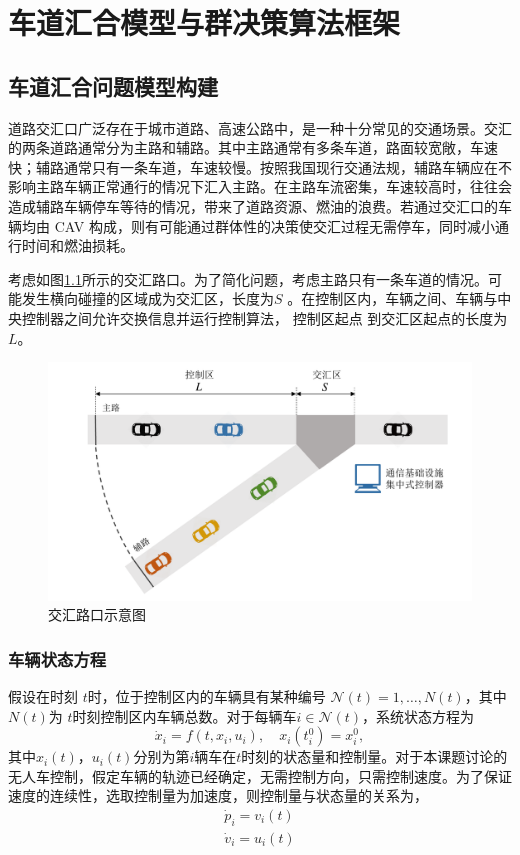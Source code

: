\chapter{车道汇合模型与群决策算法框架}
\section{车道汇合问题模型构建}
道路交汇口广泛存在于城市道路、高速公路中，是一种十分常见的交通场景。交汇的两条道路通常分为主路和辅路。其中主路通常有多条车道，路面较宽敞，车速快；辅路通常只有一条车道，车速较慢。按照我国现行交通法规，辅路车辆应在不影响主路车辆正常通行的情况下汇入主路。在主路车流密集，车速较高时，往往会造成辅路车辆停车等待的情况，带来了道路资源、燃油的浪费。若通过交汇口的车辆均由 CAV 构成，则有可能通过群体性的决策使交汇过程无需停车，同时减小通行时间和燃油损耗。

考虑如图\ref{fig:merge}所示的交汇路口。为了简化问题，考虑主路只有一条车道的情况。可能发生横向碰撞的区域成为交汇区，长度为$S$
。在控制区内，车辆之间、车辆与中央控制器之间允许交换信息并运行控制算法， 控制区起点
到交汇区起点的长度为$L$。
\begin{figure}[htbp]
\centering
\includegraphics[width=14cm]{../figures/merge.pdf}
\caption{交汇路口示意图}
\label{fig:merge}
\end{figure}

\subsection{车辆状态方程}
假设在时刻 $t$时，位于控制区内的车辆具有某种编号 $\mathcal{N}(t)={1,\dots,N(t)}$，其中 $N(t)$为 $t$时刻控制区内车辆总数。对于每辆车$i\in \mathcal{N}(t)$，系统状态方程为
\begin{equation}
\dot{x}_i=f(t,x_i,u_i),\quad x_i(t_i^0)=x_i^0,
\end{equation}
其中$x_i(t)$，$u_i(t)$分别为第$i$辆车在$t$时刻的状态量和控制量。对于本课题讨论的无人车控制，假定车辆的轨迹已经确定，无需控制方向，只需控制速度。为了保证速度的连续性，选取控制量为加速度，则控制量与状态量的关系为，
\begin{equation}
\begin{gathered}
\dot{p}_i=v_i(t)\\
\dot{v}_i=u_i(t)
\end{gathered}
\end{equation}

